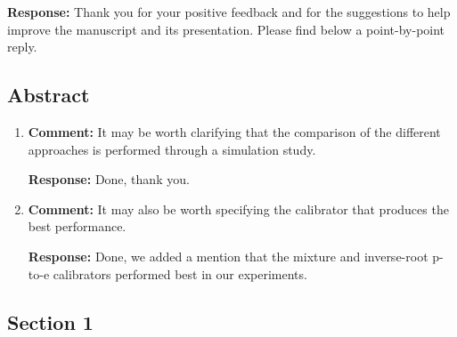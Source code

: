 \documentclass[11pt, a4paper]{article}
\newcommand{\reply}{\vspace{0.3cm} \noindent \textbf{Response:} {\it }}
\begin{document}
\reply Thank you for your positive feedback and for the suggestions to help improve the manuscript and its presentation. Please find below a point-by-point reply.

\subsection*{Abstract}


\begin{enumerate}[leftmargin=*]
\item \textbf{Comment:} It may be worth clarifying that the comparison of the different approaches is performed through a simulation study. 

\reply Done, thank you.

\vspace{0.5cm}

\item \textbf{Comment:} It may also be worth specifying the calibrator that produces the best performance.

\reply Done, we added a mention that the mixture and inverse-root p-to-e calibrators performed best in our experiments.

\vspace{0.5cm}

\end{enumerate}


\subsection*{Section 1}
\end{document}
